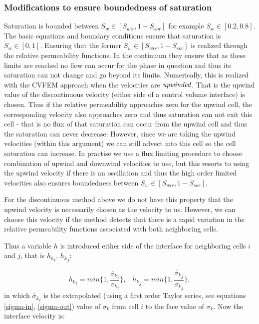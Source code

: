 \subsubsection{Modifications to ensure boundedness of saturation} 
Saturation is bounded between $S_w\in \left[ S_{wir}, 1-S_{sor} \right]$ 
for example $S_w\in \left[ 0.2, 0.8 \right]$. 
The basic equations and boundary conditions ensure that saturation is $S_w\in \left[0, 1\right]$. 
Ensuring that the former $S_w\in \left[ S_{wir}, 1-S_{sor} \right]$ is realized through the relative 
permeability functions. In the continuum they ensure that as these limits are reached 
no flow can occur for the phase in question and thus its saturation can not change and go 
beyond its limits. 
Numerically, this is realized with the CVFEM approach when the velocities are $\it upwinded$. 
That is the upwind value of the discontinuous velocity (either side of a control volume interface) 
is chosen. Thus if the relative permeability approaches zero for the upwind cell, the 
corresponding velocity also approaches zero and thus saturation can not exit this cell - that is 
no flux of that saturation can occur from the upwind cell and thus the saturation can 
never decrease. However, since we are taking the upwind velocities (within this argument)  
we can still advect into this cell so the cell saturation can increase. 
In practise we use a flux limiting procedure to choose combination of 
upwind and downwind velocities to use, but this resorts to using the upwind velocity if 
there is an oscillation and thus the high order limited velocities also ensures  
boundedness between $S_w\in\left[ S_{wir}, 1-S_{sor} \right]$. 

For the discontinuous method above we do not have this property that the upwind velocity is 
necessarily chosen as the velocity to us. However, we can choose this velocity if 
the method detects that there is a rapid variation in the relative permeability functions 
associated with both neighboring cells. 

Thus a variable $h$ is introduced either side of the interface for 
neighboring cells $i$ and $j$, that is ${h_k}_{i}$, ${h_k}_{j}$: 

\begin{equation}
{h_k}_{i} = min\{ 1,  \frac{\tilde{\sigma_k}_i}{{\sigma_k}_i} \}, \;\;\;
{h_k}_{j} = min\{ 1,  \frac{\tilde{\sigma_k}_j}{{\sigma_k}_j} \}, 
\end{equation} 
in which $\tilde{\sigma_k}_i$ is the extrapolated (using a first order Taylor series, see equations 
\ref{sigma-in}, \ref{sigma-out}) 
value of $\sigma_k$ from cell $i$ to the 
face value of $\sigma_k$. 
Now the interface velocity is:  

